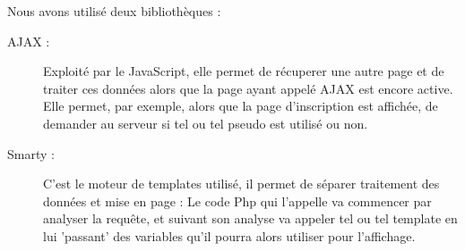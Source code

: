 Nous avons utilisé deux bibliothèques :
\begin{description}
	\item[AJAX :] Exploité par le JavaScript, elle permet de récuperer une autre page et de traiter ces données alors que la page ayant appelé AJAX est encore active.\\
Elle permet, par exemple, alors que la page d'inscription est affichée, de demander au serveur si tel ou tel pseudo est utilisé ou non.

	\item[Smarty :] C'est le moteur de templates utilisé, il permet de séparer traitement des données et mise en page : Le code Php qui l'appelle va commencer par analyser la requête, et suivant son analyse va appeler tel ou tel template en lui 'passant' des variables qu'il pourra alors utiliser pour l'affichage.
\end{description}